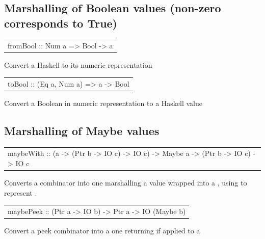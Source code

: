 \subsection{Marshalling of Boolean values (non-zero corresponds to True)}
\begin{haddockdesc}
\item[\begin{tabular}{@{}l}
fromBool :: Num a => Bool -> a
\end{tabular}]
{\haddockbegindoc
Convert a Haskell  to its numeric representation\par}
\end{haddockdesc}
\begin{haddockdesc}
\item[\begin{tabular}{@{}l}
toBool :: (Eq a, Num a) => a -> Bool
\end{tabular}]
{\haddockbegindoc
Convert a Boolean in numeric representation to a Haskell value\par}
\end{haddockdesc}
\subsection{Marshalling of Maybe values}
\begin{haddockdesc}
\item[\begin{tabular}{@{}l}
maybeWith :: (a -> (Ptr b -> IO c) -> IO c) -> Maybe a -> (Ptr b -> IO c) -> IO c
\end{tabular}]
{\haddockbegindoc
Converts a  combinator into one marshalling a value wrapped
 into a , using  to represent .\par}
\end{haddockdesc}
\begin{haddockdesc}
\item[\begin{tabular}{@{}l}
maybePeek :: (Ptr a -> IO b) -> Ptr a -> IO (Maybe b)
\end{tabular}]
{\haddockbegindoc
Convert a peek combinator into a one returning  if applied to a
 \par}
\end{haddockdesc}

